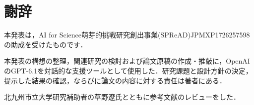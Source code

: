 \documentclass[platex]{jlreq}
\begin{document}
\section*{謝辞}

本発表は，AI for Science萌芽的挑戦研究創出事業(SPReAD)JPMXP1726257598の助成を受けたものです．

本発表の構想の整理，関連研究の検討および論文原稿の作成・推敲に，OpenAIのGPT-6.1を対話的な支援ツールとして使用した．研究課題と設計方針の決定，提示した結果の確認，ならびに論文の内容に対する責任は著者にある．

北九州市立大学研究補助者の草野遼氏とともに参考文献のレビューをした．


\end{document}
